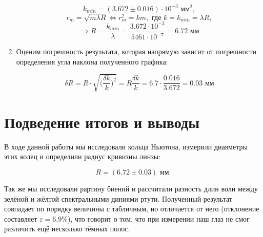 \documentclass[a4paper,12pt]{article} %
\begin{document}
\begin{enumerate}
    \[ k_{min} = (3.672\pm0.016)\cdot10^{-3}\text{ мм}^2, \]
    \[ r_m=\sqrt{m\lambda R} \Leftrightarrow r_{m}^2 = km, \text{ где } k = k_{min}=\lambda R, \]
    \[  \Longrightarrow R=\frac{k_{min}}{\lambda} = \frac{3.672\cdot10^{-3}}{5461\cdot10^{-7}}=6.72\text{ мм} \]

    \item Оценим погрешность результата, которая напрямую зависит от погрешности определения угла наклона полученного графика:

    \[ \delta R=R\cdot\sqrt{\bigg(\frac{\delta k}{k}\bigg)^2} = R\frac{\delta k}{k} = 6.7\cdot\frac{0.016}{3.672} = 0.03\text{ мм} \]
    
\end{enumerate}

\section{Подведение итогов и выводы}

В ходе данной работы мы исследовали кольца Ньютона, измерили диавметры этих колец и определили радиус кривизны линзы:

\[ R = (6.72\pm0.03)\text{ мм}. \]

Так же мы исследовали рартину биений и рассчитали разность длин волн между зелёной и жёлтой спектральными диниями ртути. Полученный результат совпадает по порядку величины с табличным, но отличается от него (отклонение составляет $\varepsilon=6.9\%$), что говорит о том, что при измерении наш глаз не смог различить ещё несколько тёмных полос.
\end{document}
